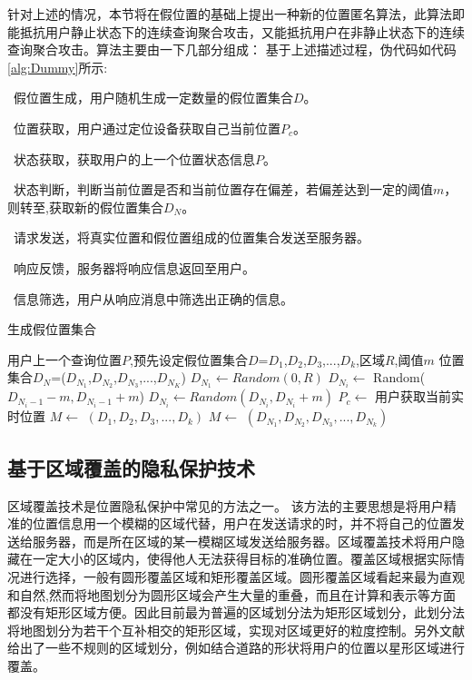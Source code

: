 针对上述的情况，本节将在假位置的基础上提出一种新的位置匿名算法，此算法即能抵抗用户静止状态下的连续查询聚合攻击，又能抵抗用户在非静止状态下的连续查询聚合攻击。算法主要由一下几部分组成：
基于上述描述过程，伪代码如代码\ref{alg:Dummy}所示:

~假位置生成，用户随机生成一定数量的假位置集合$D$。

~位置获取，用户通过定位设备获取自己当前位置$P_c$。

~状态获取，获取用户的上一个位置状态信息$P$。

~状态判断，判断当前位置是否和当前位置存在偏差，若偏差达到一定的阈值$m$，则转至,获取新的假位置集合$D_N$。

~请求发送，将真实位置和假位置组成的位置集合发送至服务器。

~响应反馈，服务器将响应信息返回至用户。

~信息筛选，用户从响应消息中筛选出正确的信息。\\
\begin{algorithm}[!htb]
\small
\renewcommand{\algorithmicrequire}{\textbf{Input:}}
\renewcommand{\algorithmicensure}{\textbf{Output:}}
\caption{生成假位置集合}
\label{alg:Dummy}
\begin{algorithmic}[1]
    \REQUIRE 用户上一个查询位置$P$,预先设定假位置集合$D$={$D_1$,$D_2$,$D_3$,...,$D_k$},区域$R$,阈值$m$
    \ENSURE 位置集合$D_N$=($D_{N_1}$,$D_{N_2}$,$D_{N_3}$,...,$D_{N_K}$)
    \STATE $D_{N_1} \gets Random(0,R)$
        \STATE $D_{N_i} \gets $ Random($D_{N_i-1}-m,D_{N_i-1}+m$)
            \STATE $D_{N_i} \gets Random(D_{N_i},D_{N_i}+m)$
        \ENDIF
    \ENDFOR
    \STATE $P_c \gets$ 用户获取当前实时位置
        \STATE $M \gets$ $(D_1,D_2,D_3,...,D_k)$
    \ELSE
        \STATE $M \gets $ $(D_{N_1},D_{N_2},D_{N_3},...,D_{N_k})$
    \ENDIF
\end{algorithmic}
\end{algorithm}

\subsection{基于区域覆盖的隐私保护技术}
区域覆盖技术是位置隐私保护中常见的方法之一\cite{Mokbel}\cite{xu2010privacy}\cite{xu2009feeling}。 该方法的主要思想是将用户精准的位置信息用一个模糊的区域代替，用户在发送请求的时，并不将自己的位置发送给服务器，而是所在区域的某一模糊区域发送给服务器。区域覆盖技术将用户隐藏在一定大小的区域内，使得他人无法获得目标的准确位置。覆盖区域根据实际情况进行选择，一般有圆形覆盖区域和矩形覆盖区域。圆形覆盖区域看起来最为直观和自然\cite{ardagna2007location}\cite{kalnis2007preventing},然而将地图划分为圆形区域会产生大量的重叠，而且在计算和表示等方面都没有矩形区域方便。因此目前最为普遍的区域划分法为矩形区域划分，此划分法将地图划分为若干个互补相交的矩形区域，实现对区域更好的粒度控制。另外文献\cite{wang2009privacy}\cite{hossain2011h}给出了一些不规则的区域划分，例如结合道路的形状将用户的位置以星形区域进行覆盖。

